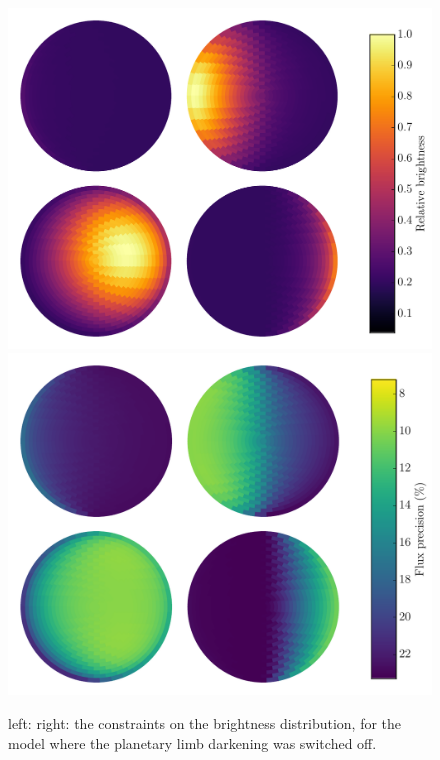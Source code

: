 \documentclass[a4paper,fleqn,usenatbib]{mnras}
\begin{document}
\begin{figure}
\begin{center}
\includegraphics[width=\columnwidth]{img/free_parametersflux_map.pdf}
\includegraphics[width=\columnwidth]{img/free_parametersflux_errs.pdf}
\caption{left: right: the constraints on the brightness distribution, for the model where the planetary limb darkening was switched off.}
\label{fig:best_fit_flux}
\end{center}
\end{figure}
\end{document}
